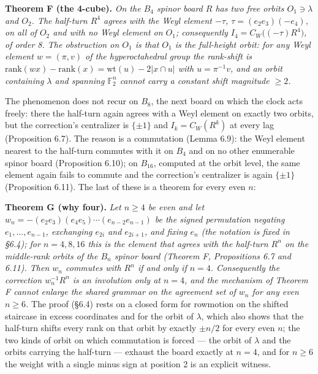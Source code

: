 \documentclass[
]{article}
\begin{document}
\textbf{Theorem F (the 4-cube).} \emph{On the \(B_4\) spinor board \(R\)
has two free orbits \(O_1 \ni \lambda\) and \(O_2\). The half-turn
\(R^4\) agrees with the Weyl element \(-\tau\),
\(\tau = (e_2 e_3)(-e_4)\), on all of \(O_2\) and with no Weyl element
on \(O_1\); consequently \(I_4 = C_W\big((-\tau)R^4\big)\), of order 8.
The obstruction on \(O_1\) is that \(O_1\) is the full-height orbit: for
any Weyl element \(w = (\pi,v)\) of the hyperoctahedral group the
rank-shift is
\(\mathrm{rank}(w x) - \mathrm{rank}(x) = \mathrm{wt}(u) - 2|x \cap u|\)
with \(u = \pi^{-1}v\), and an orbit containing \(\lambda\) and spanning
\(\mathbb{F}_2^n\) cannot carry a constant shift magnitude \(\ge 2\).}

The phenomenon does not recur on \(B_8\), the next board on which the
clock acts freely: there the half-turn again agrees with a Weyl element
on exactly two orbits, but the correction's centralizer is \(\{\pm 1\}\)
and \(I_k = C_W(R^k)\) at every lag (Proposition 6.7). The reason is a
commutation (Lemma 6.9): the Weyl element nearest to the half-turn
commutes with it on \(B_4\) and on no other enumerable spinor board
(Proposition 6.10); on \(B_{16}\), computed at the orbit level, the same
element again fails to commute and the correction's centralizer is again
\(\{\pm 1\}\) (Proposition 6.11). The last of these is a theorem for
every even \(n\):

\textbf{Theorem G (why four).} \emph{Let \(n \ge 4\) be even and let
\(w_n = -(e_2e_3)(e_4e_5)\cdots(e_{n-2}e_{n-1})\) be the signed
permutation negating \(e_1, \dots, e_{n-1}\), exchanging \(e_{2i}\) and
\(e_{2i+1}\), and fixing \(e_n\) (the notation is fixed in §6.4); for
\(n = 4, 8, 16\) this is the element that agrees with the half-turn
\(R^n\) on the middle-rank orbits of the \(B_n\) spinor board (Theorem
F, Propositions 6.7 and 6.11). Then \(w_n\) commutes with \(R^n\) if and
only if \(n = 4\). Consequently the correction \(w_n^{-1}R^n\) is an
involution only at \(n = 4\), and the mechanism of Theorem F cannot
enlarge the shared grammar on the agreement set of \(w_n\) for any even
\(n \ge 6\).} The proof (§6.4) rests on a closed form for rowmotion on
the shifted staircase in excess coordinates and for the orbit of
\(\lambda\), which also shows that the half-turn shifts every rank on
that orbit by exactly \(\pm n/2\) for every even \(n\); the two kinds of
orbit on which commutation is forced --- the orbit of \(\lambda\) and
the orbits carrying the half-turn --- exhaust the board exactly at
\(n = 4\), and for \(n \ge 6\) the weight with a single minus sign at
position 2 is an explicit witness.
\end{document}
